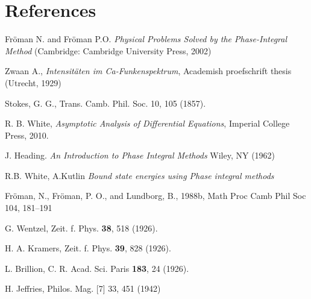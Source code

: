 \documentclass[12pt]{iopart}
\begin{document}
\section*{References}
\begin{thebibliography}{30}

 Fr\"oman N. and Fr\"oman P.O. \textit{Physical Problems Solved by the Phase-Integral Method} (Cambridge: Cambridge University Press, 2002)

 Zwaan A., \textit{Intensit\"aten im Ca-Funkenspektrum}, Academish proefschrift thesis (Utrecht, 1929)

 Stokes, G. G., Trans. Camb. Phil. Soc. 10, 105 (1857).

 R. B. White,
 {\it Asymptotic Analysis of Differential Equations}, Imperial College Press, 2010.

 J. Heading. {\it An Introduction to Phase Integral Methods} 
Wiley, NY (1962)

 R.B. White, A.Kutlin {\it Bound state energies using Phase integral methods} 

%

 Fr\"oman, N., Fr\"oman, P. O., and Lundborg, B., 1988b, Math Proc Camb Phil Soc 104, 181–191

 G. Wentzel, Zeit. f. Phys. \textbf{38}, 518 (1926).

 H. A. Kramers, Zeit. f. Phys. \textbf{39}, 828 (1926).

 L. Brillion, C. R. Acad. Sci. Paris \textbf{183}, 24 (1926).

 H. Jeffries, Philos. Mag. [7] 33, 451 (1942)

\end{thebibliography}
\end{document}
